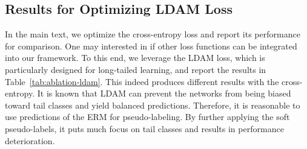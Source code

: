 \documentclass{article}
\begin{document}
\subsection{Results for Optimizing LDAM Loss}
In the main text, we optimize the cross-entropy loss and report its performance for comparison. One may interested in if other loss functions can be integrated into our framework. To this end, we leverage the LDAM loss, which is particularly designed for long-tailed learning, and report the results in Table~\ref{tab:ablation-ldam}. This indeed produces different results with the cross-entropy. It is known that LDAM can prevent the networks from being biased toward tail classes and yield balanced predictions. Therefore, it is reasonable to use predictions of the ERM for pseudo-labeling. By further applying the soft pseudo-labels, it puts much focus on tail classes and results in performance deterioration.
\end{document}
